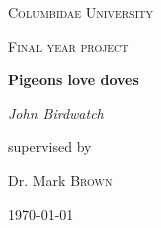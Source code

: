 \documentclass[11pt]{report}
\begin{document}

\begin{titlepage}
	\centering
	{\scshape\LARGE Columbidae University \par}
	\vspace{1cm}
	{\scshape\Large Final year project\par}
	\vspace{1.5cm}
	{\huge\bfseries Pigeons love doves\par}
	\vspace{2cm}
	{\Large\itshape John Birdwatch\par}
	\vfill
	supervised by\par
	Dr. Mark \textsc{Brown}

	\vfill

	{\large \today\par}
\end{titlepage}

\thispagestyle{empty}


\textwidth=6in
\textheight=9.2in
\oddsidemargin=0.3in
\evensidemargin=0.2in
\headheight=0.1in
\topmargin=-0.1in

\newcommand{\Robject}[1]{\texttt{#1}}
\newcommand{\Rpackage}[1]{\textsf{#1}}
\newcommand{\Rclass}[1]{\textit{#1}}
\newcommand{\R}{\textsf{R}}
\newcommand*{\h}{\hspace{5pt}}
\newcommand*{\hh}{\h\h}





\setcounter{page}{1}



\end{document}
